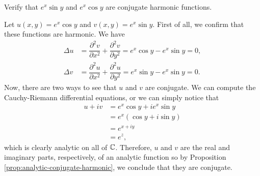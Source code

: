 \begin{exercise}
	Verify that $e^x \sin y$ and $e^x \cos y$ are conjugate harmonic functions.
	
	\begin{sol}
		Let $u(x,y)=e^x \cos y$ and $v(x,y)=e^x \sin y$. First of all, we confirm that these functions are harmonic. We have
		\begin{align*}
			\Delta u &=\dfrac{\partial^2 v}{\partial x^2}+\dfrac{\partial^2 v}{\partial y^2}= e^x \cos y-e^x \sin y=0, \\
			\Delta v &=\dfrac{\partial^2 u}{\partial x^2}+\dfrac{\partial^2 u}{\partial y^2}=e^x \sin y-e^x \sin y=0.
		\end{align*}
		Now, there are two ways to see that $u$ and $v$ are conjugate. We can compute the Cauchy-Riemann differential equations, or we can simply notice that
		\begin{align*}
			u+iv &=e^x \cos y+ie^x \sin y \\
			&=e^x\left(\cos y+i \sin y\right) \\
			&=e^{x+iy} \\
			&=e^z,
		\end{align*}
		which is clearly analytic on all of $\mathbb C$. Therefore, $u$ and $v$ are the real and imaginary parts, respectively, of an analytic function so by Proposition \ref{prop:analytic-conjugate-harmonic}, we conclude that they are conjugate.
	\end{sol}
\end{exercise}

